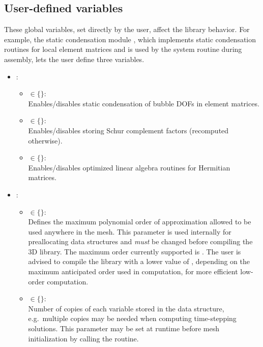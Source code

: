 \subsection{User-defined variables}

These global variables, set directly by the user, affect the library behavior. For example, the static condensation module , which implements static condensation routines for local element matrices and is used by the system routine  during assembly, lets the user define three variables.

\begin{itemize}
	\item
	{
		 :
		\begin{itemize}
			\item { $\in \{$$\}$: \\
				Enables/disables static condensation of bubble DOFs in element matrices.}
			\item { $\in \{$$\}$: \\
				Enables/disables storing Schur complement factors (recomputed otherwise).}
			\item { $\in \{$$\}$: \\
				Enables/disables optimized linear algebra routines for Hermitian matrices.}
		\end{itemize}
	}
	\item
	{
		 : 
		\begin{itemize}
			\item { $\in \{$$\}$:\\
			Defines the maximum polynomial order of approximation allowed to be used anywhere in the mesh. This parameter is used internally for preallocating data structures and \emph{must} be changed before compiling the \hp3D library. The maximum order currently supported is . The user is advised to compile the library with a lower value of , depending on the maximum anticipated order used in computation, for more efficient low-order computation.
			}
			\item { $\in \{$$\}$:\\
			Number of copies of each variable stored in the data structure, e.g.~multiple copies may be needed when computing time-stepping solutions. This parameter may be set at runtime before mesh initialization by calling the  routine.
}
\end{itemize}}
\end{itemize}
